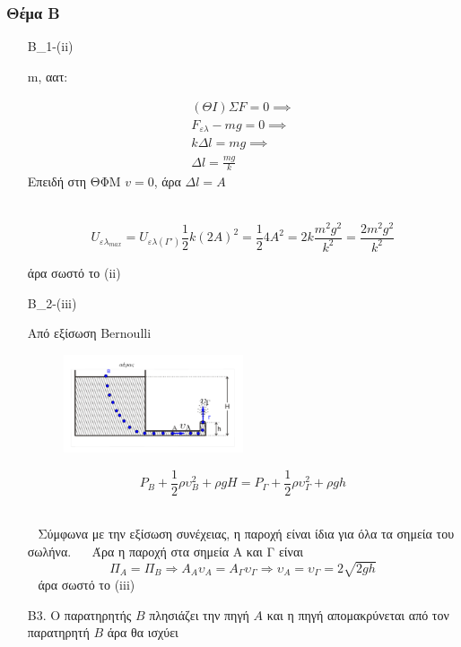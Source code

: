 \documentclass[12pt]{article}
\begin{document}
  \part*{}

  \section*{Θέμα Β}
  \begin{enumerate}
    \item [B_1-(ii)]

    m, αατ:

    \begin{gather*}
    (ΘΙ) ΣF=0 \implies \\ F_{ελ}-mg=0 \implies \\ kΔl=mg \implies \\ Δl=\frac{mg}{k}
    \end{gather*}
    Επειδή στη ΘΦΜ $v=0$, άρα $Δl=A$

    \begin{gather*}

    \end{gather*}

    $$U_{ελ_{max}}= U_{ελ(Γ')}\frac{1}{2}k\left(2A\right)^2=\frac{1}{2}4A^2=2k\frac{m^2g^2}{k^2}=\frac{2m^2g^2}{k^2}$$

    άρα σωστό το (ii)

    \item [B_2-(iii)]

    Από εξίσωση Bernoulli
    \begin{figure}[h]
      \includegraphics[width=0.5\textwidth]{ΦυσικήΒ2.png}
      \centering
    \end{figure}
    $$P_B + \frac{1}{2}ρυ_Β^2+ρgH=P_Γ+\frac{1}{2}ρυ_Γ^2+ρgh$$
    

    Σύμφωνα με την εξίσωση συνέχειας, η παροχή είναι ίδια για όλα τα σημεία του σωλήνα.
    Άρα η παροχή στα σημεία Α και Γ είναι
    $$Π_Α = Π_Β \Rightarrow A_A υ_Α = Α_Γ υ_Γ \Rightarrow υ_Α = υ_Γ = 2 \sqrt{2gh}$$
    άρα σωστό το (iii)

    \item [B3.]
    Ο παρατηρητής $Β$ πλησιάζει την πηγή $Α$ και η πηγή απομακρύνεται από τον παρατηρητή $Β$ άρα θα ισχύει


\end{enumerate}
\end{document}
